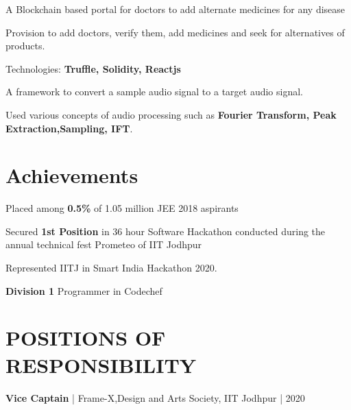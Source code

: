 \documentclass[]{deedy-resume-openfont}
\begin{document}
\begin{minipage}[t]{0.63\textwidth}
\begin{tightemize}
\item A Blockchain based portal for doctors to add alternate medicines for any disease
\item Provision to add doctors, verify them, add medicines and seek for alternatives of products.
\item Technologies: \textbf{Truffle, Solidity, Reactjs}
\end{tightemize}

\begin{tightemize}
\item A framework to convert a sample audio signal to a target audio signal.
\item Used various concepts of audio processing such as \textbf{Fourier Transform, Peak Extraction,Sampling, IFT}.
\end{tightemize}
\sectionsep


\section{Achievements}
\vspace{\topsep}
\begin{tightemize}
\item Placed among \textbf{0.5\%} of 1.05 million JEE 2018 aspirants
\item Secured \textbf{1st Position} in 36 hour Software Hackathon conducted during the annual technical fest Prometeo of IIT Jodhpur
\item Represented IITJ in Smart India Hackathon 2020.
\item \textbf{Division 1} Programmer in Codechef

\end{tightemize}
\sectionsep


\section{POSITIONS OF RESPONSIBILITY}
\item \textbf{Vice Captain} | Frame-X,Design and Arts Society, IIT Jodhpur | 2020
\sectionsep


\end{minipage}
\end{document}
